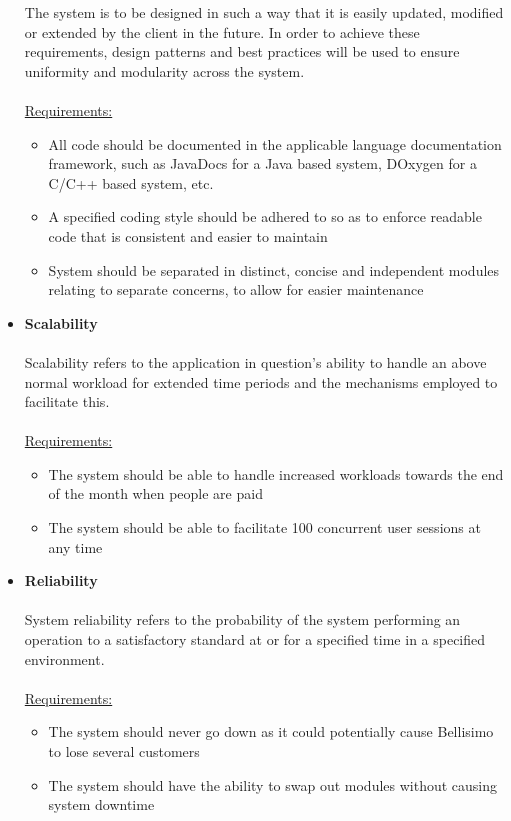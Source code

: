 \documentclass[a4paper,10pt]{article}
\begin{document}
\begin{itemize}
	The system is to be designed in such a way that it is easily updated, modified or extended by the client in the future. In order to achieve these requirements, design patterns and best practices will be used to ensure uniformity and modularity across the system.\\\\
	 \underline{Requirements:}
	 \begin{itemize}
		\item All code should be documented in the applicable language documentation framework, such as JavaDocs for a Java based system, DOxygen for a C/C++ based system, etc. 
		\item A specified coding style should be adhered to so as to enforce readable code that is consistent and easier to maintain
		\item System should be separated in distinct, concise and independent modules relating to separate concerns, to allow for easier maintenance
	\end{itemize}
	\item  \textbf{Scalability} \\\\
	Scalability refers to the application in question’s ability to handle an above normal workload for extended time periods and the mechanisms employed to facilitate this.\\\\
	 \underline{Requirements:}
	 \begin{itemize}
		\item The system should be able to handle increased workloads towards the end of the month when people are paid
		\item The system should be able to facilitate 100 concurrent user sessions at any time
	\end{itemize}
	\item  \textbf{Reliability} \\\\
	System reliability refers to the probability of the system performing an operation to a satisfactory standard at or for a specified time in a specified environment.\\\\
	 \underline{Requirements:}
	 \begin{itemize}
		\item The system should never go down as it could potentially cause Bellisimo to lose several customers
		\item The system should have the ability to swap out modules without causing system downtime

\end{itemize}
\end{itemize}
\end{document}

